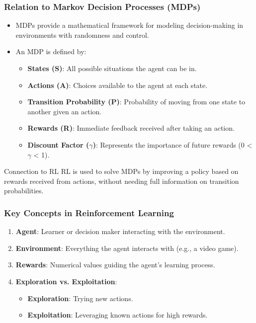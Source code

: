 \documentclass[aspectratio=169]{beamer}
\begin{document}
\begin{frame}[fragile]
    \frametitle{Relation to Markov Decision Processes (MDPs)}
    \begin{itemize}
        \item MDPs provide a mathematical framework for modeling decision-making in environments with randomness and control.
        \item An MDP is defined by:
        \begin{itemize}
            \item \textbf{States (S)}: All possible situations the agent can be in.
            \item \textbf{Actions (A)}: Choices available to the agent at each state.
            \item \textbf{Transition Probability (P)}: Probability of moving from one state to another given an action.
            \item \textbf{Rewards (R)}: Immediate feedback received after taking an action.
            \item \textbf{Discount Factor ($\gamma$)}: Represents the importance of future rewards (0 < $\gamma$ < 1).
        \end{itemize}
    \end{itemize}
    \begin{block}{Connection to RL}
        RL is used to solve MDPs by improving a policy based on rewards received from actions, without needing full information on transition probabilities.
    \end{block}
\end{frame}

\begin{frame}[fragile]
    \frametitle{Key Concepts in Reinforcement Learning}
    \begin{enumerate}
        \item \textbf{Agent}: Learner or decision maker interacting with the environment.
        \item \textbf{Environment}: Everything the agent interacts with (e.g., a video game).
        \item \textbf{Rewards}: Numerical values guiding the agent's learning process.
        \item \textbf{Exploration vs. Exploitation}:
        \begin{itemize}
            \item \textbf{Exploration}: Trying new actions.
            \item \textbf{Exploitation}: Leveraging known actions for high rewards.
        \end{itemize}
    \end{enumerate}
\end{frame}
\end{document}
